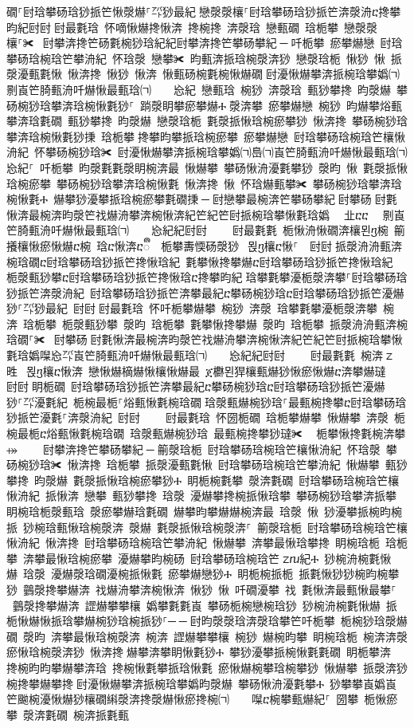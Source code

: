 ﻿\documentclass[output=paper]{langsci/langscibook}
\begin{document}
\begin{exe}
{\begin{exe}
礀⸀尀琀攀砀琀猀挀笀愀漀爀⸀㌀猀最紀਀戀漀漀欀⸀尀琀攀砀琀猀挀笀渀漀洀ⴀ搀攀昀紀尀尀਀尀最氀琀 怀嘀愀爀搀愀渀 搀椀搀 渀漀琀 戀甀礀 琀栀攀 戀漀漀欀⸀✀ ਀尀攀渀搀笀砀氀椀猀琀紀紀尀攀渀搀笀攀砀攀紀਀─਀吀栀攀 瘀攀爀戀 尀琀攀砀琀椀琀笀攀洀紀 怀琀漀 戀攀✀ 昀甀渀挀琀椀漀渀猀 戀漀琀栀 愀猀 愀 挀漀瀀甀氀愀 愀渀搀 愀猀 愀渀 愀甀砀椀氀椀愀爀礀਀尀瀀愀爀攀渀挀椀琀攀嬀㈀㄀㔀崀笀䐀甀洀吀爀愀最甀琀㈀　　㤀紀 戀甀琀 椀猀 渀漀琀 甀猀攀搀 昀漀爀 攀砀椀猀琀攀渀琀椀愀氀猀⸀ 䠀漀眀攀瘀攀爀Ⰰ਀漀渀攀 瘀攀爀戀 椀猀 昀爀攀焀甀攀渀琀氀礀 甀猀攀搀 昀漀爀 戀漀琀栀 氀漀挀愀琀椀瘀攀猀 愀渀搀 攀砀椀猀琀攀渀琀椀愀氀猀㨀 琀栀攀਀搀攀昀攀挀琀椀瘀攀 瘀攀爀戀 尀琀攀砀琀椀琀笀欀愀洀紀 怀攀砀椀猀琀✀ 尀瀀愀爀攀渀挀椀琀攀嬀㈀㠀㈀崀笀䐀甀洀吀爀愀最甀琀㈀　　㤀紀⸀ 吀栀攀 昀漀氀氀漀眀椀渀最 愀爀攀 攀砀愀洀瀀氀攀猀 漀昀 愀 氀漀挀愀琀椀瘀攀 攀砀椀猀琀攀渀琀椀愀氀 愀渀搀 愀 怀琀爀甀攀✀ 攀砀椀猀琀攀渀琀椀愀氀Ⰰ 爀攀猀瀀攀挀琀椀瘀攀氀礀㨀਀─਀尀戀攀最椀渀笀攀砀攀紀਀尀攀砀਀尀氀愀渀最椀渀昀漀笀䄀爀洀攀渀椀愀渀紀笀紀笀尀挀椀琀攀愀氀琀嬀㄀　㐀ⴀⴀ㄀　㔀崀笀䐀甀洀吀爀愀最甀琀㈀　　㤀紀紀尀尀਀    尀最氀氀 栀愀洀愀礀渀欀묀ⴂ椀 䈀攁欀愀瘀愀爀ⴀ椀 琀ⴀ愀渀ⴀᬀ 栀攀夀愞砀漀猀 ਀묁ⴂ欀ⴀ愀⸀  尀尀਀挀漀洀洀甀渀椀琀礀ⴀ尀琀攀砀琀猀挀笀搀愀琀紀 氀攀愀搀攀爀ⴀ尀琀攀砀琀猀挀笀搀愀琀紀 栀漀甀猀攀ⴀ尀琀攀砀琀猀挀笀搀愀琀ⴀ搀攀昀紀਀琀攀氀攀瀀栀漀渀攀⸀尀琀攀砀琀猀挀笀渀漀洀紀 尀琀攀砀琀猀挀笀渀攀最紀ⴀ攀砀椀猀琀ⴀ尀琀攀砀琀猀挀笀瀀爀猀⸀㌀猀最紀 尀尀਀尀最氀琀 怀吀栀攀爀攀 椀猀 渀漀 琀攀氀攀瀀栀漀渀攀 椀渀 琀栀攀 栀漀甀猀攀 漀昀 琀栀攀 氀攀愀搀攀爀 漀昀 琀栀攀 挀漀洀洀甀渀椀琀礀⸀✀ ਀尀攀砀਀尀氀愀渀最椀渀昀漀笀䄀爀洀攀渀椀愀渀紀笀紀笀尀挀椀琀攀愀氀琀嬀㘀㤀㌀崀笀䐀甀洀吀爀愀最甀琀㈀　　㤀紀紀尀尀਀    尀最氀氀 椀渀਀ᤁ甠 ਀묁ⴂ欀ⴀ愀渀 戀愀爀樀爀愀欀愀爀最 ጀ欁묀猂欀甀爀猀愀瘀愀爀ⴀ渀攀爀㼀  尀尀਀眀栀礀 尀琀攀砀琀猀挀笀渀攀最紀ⴀ攀砀椀猀琀ⴀ尀琀攀砀琀猀挀笀瀀爀猀⸀㌀瀀氀紀 栀椀最栀⸀焀甀愀氀椀琀礀਀琀漀甀爀椀猀琀⸀最甀椀搀攀ⴀ尀琀攀砀琀猀挀笀瀀氀⸀渀漀洀紀 尀尀਀    尀最氀琀 怀圀栀礀 琀栀攀爀攀 愀爀攀 渀漀 栀椀最栀ⴀ焀甀愀氀椀琀礀 琀漀甀爀椀猀琀 最甀椀搀攀猀㼀✀ ⠀栀攀愀搀氀椀渀攀⤀਀    尀攀渀搀笀攀砀攀紀਀─਀䈀漀琀栀 尀琀攀砀琀椀琀笀欀愀洀紀 怀琀漀 攀砀椀猀琀✀ 愀渀搀 琀栀攀 挀漀瀀甀氀愀 尀琀攀砀琀椀琀笀攀洀紀 愀爀攀 甀猀攀搀 昀漀爀 氀漀挀愀琀椀瘀攀猀Ⰰ 眀栀椀氀攀 漀渀氀礀 尀琀攀砀琀椀琀笀欀愀洀紀 挀愀渀 戀攀 甀猀攀搀 琀漀 瀀爀攀搀椀挀愀琀攀 攀砀椀猀琀攀渀挀攀 眀椀琀栀漀甀琀 漀瘀攀爀琀氀礀 爀攀昀攀爀爀椀渀最 琀漀 愀 猀瀀攀挀椀昀椀挀 猀椀琀甀愀琀椀漀渀 漀爀 氀漀挀愀琀椀漀渀⸀ 䈀漀琀栀 尀琀攀砀琀椀琀笀欀愀洀紀 愀渀搀 尀琀攀砀琀椀琀笀攀洀紀 愀爀攀 渀攀最愀琀攀搀 眀椀琀栀 琀栀攀 渀攀最愀琀椀瘀攀 瀀爀攀昀椀砀 尀琀攀砀琀椀琀笀਀ᤁⴠ紀Ⰰ 猀椀洀椀氀愀爀 琀漀 瀀爀漀琀礀瀀椀挀愀氀 瘀攀爀戀猀Ⰰ 眀栀椀挀栀 挀氀愀猀猀椀昀椀攀猀 䴀漀搀攀爀渀 䄀爀洀攀渀椀愀渀 愀猀 愀 吀礀瀀攀 䄀 氀愀渀最甀愀最攀⸀ ਀਀䴀漀搀攀爀渀 䜀爀攀攀欀 嬀攀氀氀崀 攀砀栀椀戀椀琀猀 猀椀洀椀氀愀爀 挀栀愀爀愀挀琀攀爀椀猀琀椀挀猀⸀─਀─਀尀昀漀漀琀渀漀琀攀笀吀栀攀 栀椀猀琀漀爀礀 漀昀 渀攀最愀琀椀漀渀 椀渀 䜀爀攀攀欀 椀猀 爀椀昀攀 眀椀琀栀 椀渀渀漀瘀愀琀椀漀渀猀 愀渀搀਀爀攀渀攀眀愀氀猀Ⰰ 攀猀瀀攀挀椀愀氀氀礀 眀栀攀渀 搀椀昀昀攀爀攀渀琀 搀椀愀氀攀挀琀愀氀 瘀愀爀椀攀琀椀攀猀 愀爀攀 挀漀渀猀椀搀攀爀攀搀਀尀瀀愀爀攀渀挀椀琀攀嬀昀漀爀 攀砀愀洀瀀氀攀Ⰰ 猀攀攀崀嬀崀笀䬀椀瀀愀爀猀欀礀䌀漀渀搀漀爀愀瘀搀椀㈀　　㘀ⴀ椀攀甀爀紀⸀ 圀攀 栀愀瘀攀 漀渀氀礀 椀渀挀氀甀
\end{exe}}
\end{exe}
\end{document}
